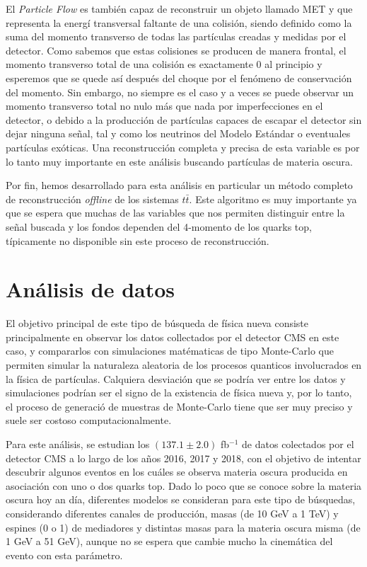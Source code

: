 \documentclass[a4paper, 10pt, openright]{report}
\begin{document}
\begin{appendices}
El \textit{Particle Flow} es tambi\'{e}n capaz de reconstruir un objeto llamado \ac{MET} y que representa la energ\'{i} transversal faltante de una colisi\'{o}n, siendo definido como la suma del momento transverso de todas las part\'{i}culas creadas y medidas por el detector. Como sabemos que estas colisiones se producen de manera frontal, el momento transverso total de una colisi\'{o}n es exactamente 0 al principio y esperemos que se quede as\'{i} despu\'{e}s del choque por el fen\'{o}meno de conservaci\'{o}n del momento. Sin embargo, no siempre es el caso y a veces se puede observar un momento transverso total no nulo m\'{a}s que nada por imperfecciones en el detector, o debido a la producci\'{o}n de part\'{i}culas capaces de escapar el detector sin dejar ninguna se\~{n}al, tal y como los neutrinos del Modelo Est\'{a}ndar o eventuales part\'{i}culas ex\'{o}ticas. Una reconstrucci\'{o}n completa y precisa de esta variable es por lo tanto muy importante en este an\'{a}lisis buscando part\'{i}culas de materia oscura.

Por fin, hemos desarrollado para esta an\'{a}lisis en particular un m\'{e}todo completo de reconstrucci\'{o}n \textit{offline} de los sistemas $t \bar t$. Este algoritmo es muy importante ya que se espera que muchas de las variables que nos permiten distinguir entre la se\~{n}al buscada y los fondos dependen del 4-momento de los quarks top, t\'{i}picamente no disponible sin este proceso de reconstrucci\'{o}n.

\section{An\'{a}lisis de datos}

El objetivo principal de este tipo de b\'{u}squeda de f\'{i}sica nueva consiste principalmente en observar los datos collectados por el detector \ac{CMS} en este caso, y compararlos con simulaciones mat\'{e}maticas de tipo Monte-Carlo que permiten simular la naturaleza aleatoria de los procesos quanticos involucrados en la f\'{i}sica de part\'{i}culas. Calquiera desviaci\'{o}n que se podr\'{i}a ver entre los datos y simulaciones podr\'{i}an ser el signo de la existencia de f\'{i}sica nueva y, por lo tanto, el proceso de generaci\'{o} de muestras de Monte-Carlo tiene que ser muy preciso y suele ser costoso computacionalmente.  

Para este an\'{a}lisis, se estudian los $(137.1 \pm 2.0)$ fb$^{-1}$ de datos colectados por el detector \ac{CMS} a lo largo de los a\~{n}os 2016, 2017 y 2018, con el objetivo de intentar descubrir algunos eventos en los cu\'{a}les se observa materia oscura producida en asociaci\'{o}n con uno o dos quarks top. Dado lo poco que se conoce sobre la materia oscura hoy an d\'{i}a, diferentes modelos se consideran para este tipo de b\'{u}squedas, considerando diferentes canales de producci\'{o}n, masas (de 10 GeV a 1 TeV) y espines (0 o 1) de mediadores y distintas masas para la materia oscura misma (de 1 GeV a 51 GeV), aunque no se espera que cambie mucho la cinem\'{a}tica del evento con esta par\'{a}metro.


\end{appendices}
\end{document}
